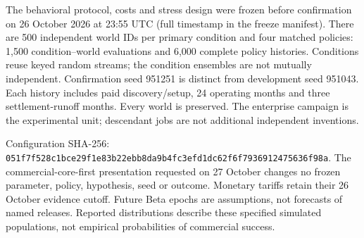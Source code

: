 The behavioral protocol, costs and stress design were frozen before confirmation on 26 October 2026 at 23:55 UTC (full timestamp in the freeze manifest). There are 500 independent world IDs per primary condition and four matched policies: 1,500 condition--world evaluations and 6,000 complete policy histories. Conditions reuse keyed random streams; the condition ensembles are not mutually independent. Confirmation seed 951251 is distinct from development seed 951043. Each history includes paid discovery/setup, 24 operating months and three settlement-runoff months. Every world is preserved. The enterprise campaign is the experimental unit; descendant jobs are not additional independent inventions.

Configuration SHA-256: \nolinkurl{051f7f528c1bce29f1e83b22ebb8da9b4fc3efd1dc62f6f7936912475636f98a}. The commercial-core-first presentation requested on 27 October changes no frozen parameter, policy, hypothesis, seed or outcome. Monetary tariffs retain their 26 October evidence cutoff. Future Beta epochs are assumptions, not forecasts of named releases. Reported distributions describe these specified simulated populations, not empirical probabilities of commercial success.
